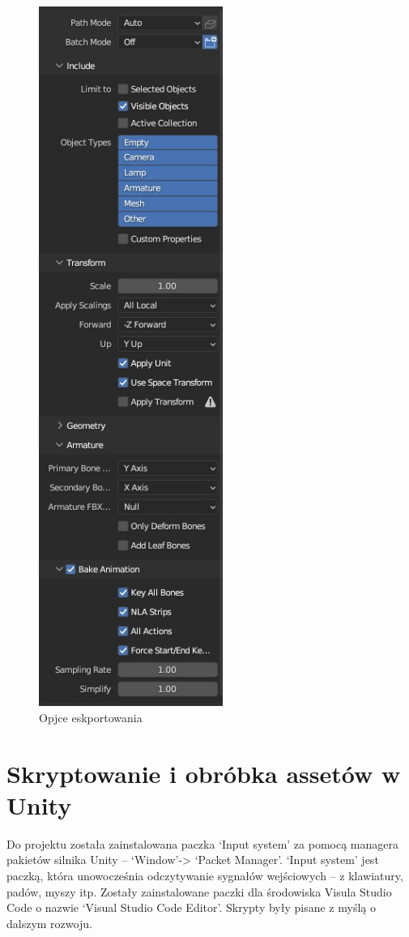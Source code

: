 \documentclass[12pt,twoside]{article}
\begin{document}
\begin{figure}[!ht]
    \centering
	\includegraphics[width=6cm]{RealizacjaProjektu/Export/ExportOptions.jpg}
	\caption{Opjce eskportowania}
    \label{ExportFBXOptions}
\end{figure}

\clearpage
\section{Skryptowanie i obróbka assetów w Unity}
Do projektu została zainstalowana paczka `Input system' za pomocą managera
pakietów silnika Unity -- `Window'-> `Packet Manager'. `Input system' jest
paczką, która unowocześnia odczytywanie sygnałów wejściowych -- z klawiatury,
padów, myszy itp. Zostały zainstalowane paczki dla środowiska Visula Studio Code
o nazwie `Visual Studio Code Editor'. Skrypty były pisane z myślą o dalszym rozwoju. 
\end{document}
